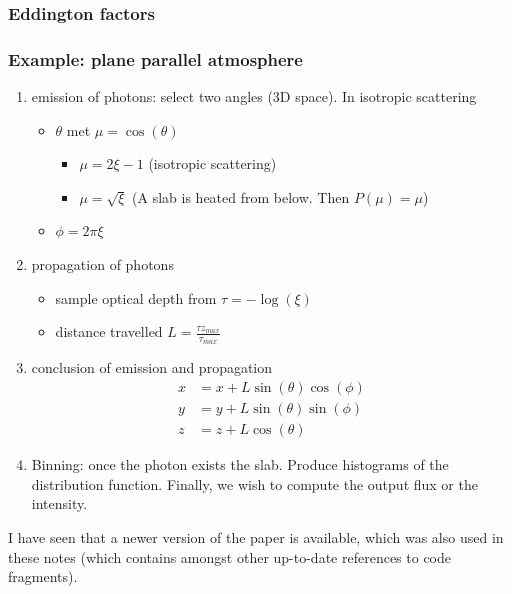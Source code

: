 \documentclass[10pt,a4paper]{article}
\begin{document}
\subsubsection{Eddington factors}

\subsubsection{Example: plane parallel atmosphere}
\begin{enumerate}

\item emission of photons: select two angles (3D space). In isotropic scattering
\begin{itemize}
\item $\theta$ met $\mu = \cos(\theta)$
	\begin{itemize}
	\item $\mu = 2\xi -1$ (isotropic scattering)
	\item $\mu = \sqrt{\xi}$ (A slab is heated from below. Then $P(\mu) = \mu$)
	\end{itemize}
\item $\phi = 2 \pi \xi$
\end{itemize}

\item propagation of photons
\begin{itemize}
\item sample optical depth from $\tau = -\log(\xi)$
\item distance travelled $L = \frac{\tau z_{max}}{\tau_{max}}$
\end{itemize}

\item conclusion of emission and propagation
\begin{equation}
\begin{aligned}
x &= x + L \sin(\theta) \cos(\phi) \\
y &= y + L \sin(\theta) \sin(\phi) \\
z &= z + L \cos(\theta)
\end{aligned}
\end{equation}

\item Binning: once the photon exists the slab. Produce histograms of the distribution function. Finally, we wish to compute the output flux or the intensity.
\end{enumerate}

I have seen that a newer version of the paper is available, which was also used in these notes (which contains amongst other up-to-date references to code fragments).
\end{document}
